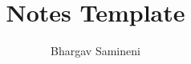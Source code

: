 \documentclass[11pt]{article}
\title{Notes Template}
\author{
	Bhargav Samineni
}
\date{}
\begin{document}
    \maketitle  

    \begin{abstract}
        \lipsum[2]
    \end{abstract}

    
    
    \newpage
    
    
 
\end{document}
